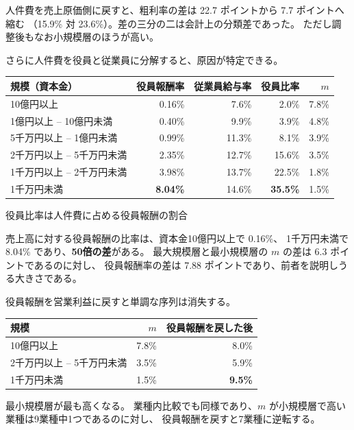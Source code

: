 人件費を売上原価側に戻すと、粗利率の差は 22.7 ポイントから 7.7 ポイントへ縮む
（15.9\% 対 23.6\%）。差の三分の二は会計上の分類差であった。
ただし調整後もなお小規模層のほうが高い。

さらに人件費を役員と従業員に分解すると、原因が特定できる。

\begin{center}
\begin{tabular}{@{}lrrrr@{}}
\toprule
規模（資本金） & 役員報酬率 & 従業員給与率 & 役員比率 & $m$ \\
\midrule
10億円以上 & 0.16\% & 7.6\% & 2.0\% & 7.8\% \\
1億円以上 -- 10億円未満 & 0.40\% & 9.9\% & 3.9\% & 4.8\% \\
5千万円以上 -- 1億円未満 & 0.99\% & 11.3\% & 8.1\% & 3.9\% \\
2千万円以上 -- 5千万円未満 & 2.35\% & 12.7\% & 15.6\% & 3.5\% \\
1千万円以上 -- 2千万円未満 & 3.98\% & 13.7\% & 22.5\% & 1.8\% \\
1千万円未満 & \textbf{8.04\%} & 14.6\% & \textbf{35.5\%} & 1.5\% \\
\bottomrule
\end{tabular}
\label{tab:officer-comp-by-size}
\end{center}
\begin{center}\footnotesize 役員比率は人件費に占める役員報酬の割合\end{center}

\begin{proposition}
\label{prop:officer}
売上高に対する役員報酬の比率は、資本金10億円以上で 0.16\%、
1千万円未満で 8.04\% であり、\textbf{50倍の差}がある。
最大規模層と最小規模層の $m$ の差は 6.3 ポイントであるのに対し、
役員報酬率の差は 7.88 ポイントであり、前者を説明しうる大きさである。

役員報酬を営業利益に戻すと単調な序列は消失する。
\begin{center}
\begin{tabular}{@{}lrr@{}}
\toprule
規模 & $m$ & 役員報酬を戻した後 \\
\midrule
10億円以上 & 7.8\% & 8.0\% \\
2千万円以上 -- 5千万円未満 & 3.5\% & 5.9\% \\
1千万円未満 & 1.5\% & \textbf{9.5\%} \\
\bottomrule
\end{tabular}
\label{tab:officer-comp-adjusted}
\end{center}
最小規模層が最も高くなる。
業種内比較でも同様であり、$m$ が小規模層で高い業種は9業種中1つであるのに対し、
役員報酬を戻すと7業種に逆転する。
\end{proposition}

